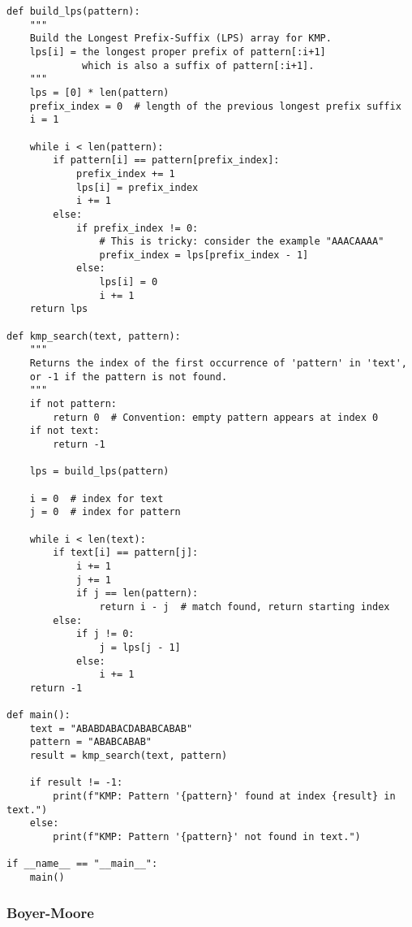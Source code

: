 \documentclass[a4paper,12pt]{article}
\begin{document}
\begin{lstlisting}[style=pythonstyle]
def build_lps(pattern):
    """
    Build the Longest Prefix-Suffix (LPS) array for KMP.
    lps[i] = the longest proper prefix of pattern[:i+1]
             which is also a suffix of pattern[:i+1].
    """
    lps = [0] * len(pattern)
    prefix_index = 0  # length of the previous longest prefix suffix
    i = 1

    while i < len(pattern):
        if pattern[i] == pattern[prefix_index]:
            prefix_index += 1
            lps[i] = prefix_index
            i += 1
        else:
            if prefix_index != 0:
                # This is tricky: consider the example "AAACAAAA"
                prefix_index = lps[prefix_index - 1]
            else:
                lps[i] = 0
                i += 1
    return lps

def kmp_search(text, pattern):
    """
    Returns the index of the first occurrence of 'pattern' in 'text',
    or -1 if the pattern is not found.
    """
    if not pattern:
        return 0  # Convention: empty pattern appears at index 0
    if not text:
        return -1

    lps = build_lps(pattern)

    i = 0  # index for text
    j = 0  # index for pattern

    while i < len(text):
        if text[i] == pattern[j]:
            i += 1
            j += 1
            if j == len(pattern):
                return i - j  # match found, return starting index
        else:
            if j != 0:
                j = lps[j - 1]
            else:
                i += 1
    return -1

def main():
    text = "ABABDABACDABABCABAB"
    pattern = "ABABCABAB"
    result = kmp_search(text, pattern)
    
    if result != -1:
        print(f"KMP: Pattern '{pattern}' found at index {result} in text.")
    else:
        print(f"KMP: Pattern '{pattern}' not found in text.")

if __name__ == "__main__":
    main()
\end{lstlisting}

\subsubsection{Boyer-Moore}
\end{document}
